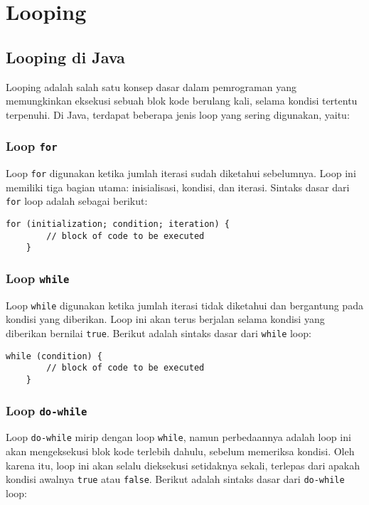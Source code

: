 \chapter{Looping}

\section{Looping di Java}

Looping adalah salah satu konsep dasar dalam pemrograman yang memungkinkan eksekusi sebuah blok kode berulang kali, selama kondisi tertentu terpenuhi. Di Java, terdapat beberapa jenis loop yang sering digunakan, yaitu:

\subsection{Loop \texttt{for}}
Loop \texttt{for} digunakan ketika jumlah iterasi sudah diketahui sebelumnya. Loop ini memiliki tiga bagian utama: inisialisasi, kondisi, dan iterasi. Sintaks dasar dari \texttt{for} loop adalah sebagai berikut:

\begin{lstlisting}[style=JavaStyle]
	for (initialization; condition; iteration) {
		// block of code to be executed
	}
\end{lstlisting}

\subsection{Loop \texttt{while}}
Loop \texttt{while} digunakan ketika jumlah iterasi tidak diketahui dan bergantung pada kondisi yang diberikan. Loop ini akan terus berjalan selama kondisi yang diberikan bernilai \texttt{true}. Berikut adalah sintaks dasar dari \texttt{while} loop:

\begin{lstlisting}[style=JavaStyle]
	while (condition) {
		// block of code to be executed
	}
\end{lstlisting}

\subsection{Loop \texttt{do-while}}
Loop \texttt{do-while} mirip dengan loop \texttt{while}, namun perbedaannya adalah loop ini akan mengeksekusi blok kode terlebih dahulu, sebelum memeriksa kondisi. Oleh karena itu, loop ini akan selalu dieksekusi setidaknya sekali, terlepas dari apakah kondisi awalnya \texttt{true} atau \texttt{false}. Berikut adalah sintaks dasar dari \texttt{do-while} loop:

